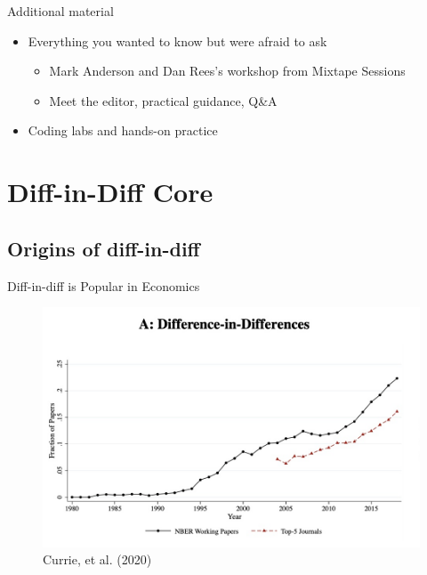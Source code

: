 \documentclass{beamer}
\begin{document}
\begin{frame}{Additional material}

\begin{itemize}
\item Everything you wanted to know but were afraid to ask	
	\begin{itemize}
	\item Mark Anderson and Dan Rees's workshop from Mixtape Sessions
	\item Meet the editor, practical guidance, Q\&A
	\end{itemize}
\item Coding labs and hands-on practice
\end{itemize}

\end{frame}


\section{Diff-in-Diff Core}


\subsection{Origins of diff-in-diff}


\begin{frame}{Diff-in-diff is Popular in Economics}

	\begin{figure}
	\caption{Currie, et al. (2020)}
	\includegraphics[scale=0.25]{./lecture_includes/currie_did.png}
	\end{figure}

\bigskip

\footnotesize


\end{frame}
\end{document}
